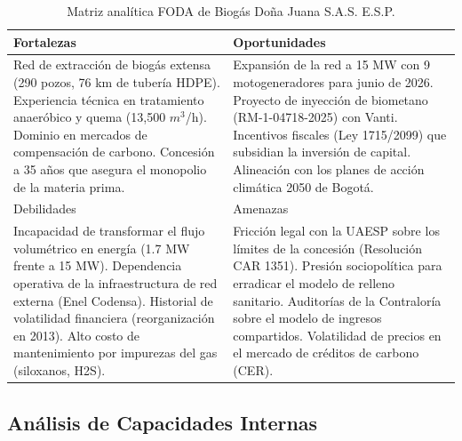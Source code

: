 \documentclass[11pt,letterpaper]{article}
\begin{document}
\begin{table}[htbp]
  \centering
  \caption{Matriz analítica FODA de Biogás Doña Juana S.A.S. E.S.P.}
  \label{tab:foda}
  \begin{tabular}{p{} p{}}
    \toprule
    Fortalezas & Oportunidades \\
    \midrule
    Red de extracción de biogás extensa (290 pozos, 76 km de tubería HDPE).
    \newline
    Experiencia técnica en tratamiento anaeróbico y quema (13,500 $m^3$/h).
    \newline
    Dominio en mercados de compensación de carbono.
    \newline
    Concesión a 35 años que asegura el monopolio de la materia prima.  &
    Expansión de la red a 15 MW con 9 motogeneradores para junio de 2026.
    \newline
    Proyecto de inyección de biometano (RM-1-04718-2025) con Vanti.
    \newline
    Incentivos fiscales (Ley 1715/2099) que subsidian la
    inversión de capital. \newline Alineación con los
    planes de acción climática 2050 de Bogotá. \\
    \midrule
    Debilidades & Amenazas \\
    \midrule
    Incapacidad de transformar el flujo volumétrico en energía (1.7 MW frente a
    15 MW).
    \newline
    Dependencia operativa de la infraestructura de red externa (Enel Codensa).
    \newline
    Historial de volatilidad financiera (reorganización en 2013).
    \newline
    Alto costo de mantenimiento por impurezas del gas (siloxanos, H2S). &
    Fricción legal con la UAESP sobre los límites de la concesión (Resolución
    CAR 1351).
    \newline Presión sociopolítica para erradicar el modelo de relleno sanitario.
    \newline Auditorías de la Contraloría sobre el modelo de ingresos compartidos.
    \newline Volatilidad de precios en el mercado de créditos de carbono (CER).
    \\
    \bottomrule
  \end{tabular}
\end{table}

\subsection{Análisis de Capacidades Internas}
\end{document}
